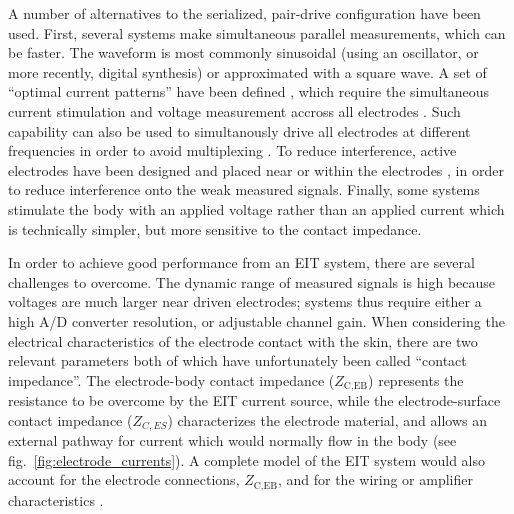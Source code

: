 \documentclass[10pt,journal]{IEEEtran}\def\TBLWIDA{15mm}\def\TBLWIDB{60mm}
\newcommand\fref[1]{fig.\ \ref{#1}}
\begin{document}
A number of alternatives to the serialized, pair-drive configuration have been used.
First, several systems make
simultaneous parallel measurements, %
which can be faster. The waveform is most commonly
sinusoidal (using an oscillator, or more recently, digital synthesis)
or approximated with a square wave.
A set of ``optimal current patterns'' have been defined
\cite{Isaacson1989Optimal}, which require the simultaneous
current stimulation and voltage measurement accross
all electrodes \cite{Hua1991Optimal}. Such capability can
also be used to simultanously drive all electrodes at
different frequencies in order to avoid
multiplexing \cite{Rapin2015Cooperative}.
To reduce interference, active electrodes have been designed
and placed near or within the electrodes \cite{Li1996Active},
in order to reduce interference onto the weak measured signals.
Finally, some systems stimulate the body with an applied
voltage rather than an applied current \cite{Khan2015FPGA}
which is technically simpler, but more sensitive to the contact impedance.

In order to achieve good performance from an EIT system, there
are several challenges to overcome. The dynamic range of
measured signals is high because voltages are much larger near
driven electrodes; systems thus require either a high
A/D converter resolution, or adjustable channel gain.
When considering the electrical characteristics of the
electrode contact with the skin, there are two relevant parameters
both of which have unfortunately been called ``contact impedance''.
The electrode-body contact impedance ($Z_\textrm{C,EB}$) represents the resistance
to be overcome by the EIT current source, while the electrode-surface
contact impedance ($Z_{C,ES}$) characterizes the electrode material, and
 allows an external pathway for current which would normally
flow in the body (see \fref{fig:electrode_currents}).
A complete model of the EIT system would also account for the 
electrode connections, $Z_\textrm{C,EB}$, and 
for the wiring or amplifier characteristics \cite{Hartinger2007Hardware}.
\end{document}
